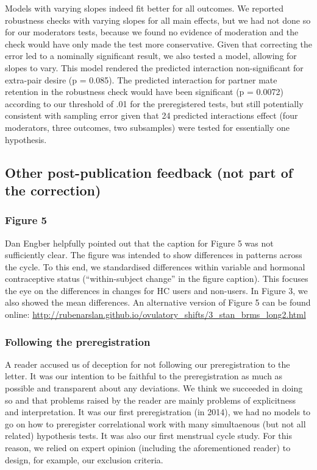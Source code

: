 \documentclass[]{article}
\begin{document}
Models with varying slopes indeed fit better for all outcomes. We
reported robustness checks with varying slopes for all main effects, but
we had not done so for our moderators tests, because we found no
evidence of moderation and the check would have only made the test more
conservative. Given that correcting the error led to a nominally
significant result, we also tested a model, allowing for slopes to vary.
This model rendered the predicted interaction non-significant for
extra-pair desire (p = 0.085). The predicted interaction for partner
mate retention in the robustness check would have been significant (p =
0.0072) according to our threshold of .01 for the preregistered tests,
but still potentially consistent with sampling error given that 24
predicted interactions effect (four moderators, three outcomes, two
subsamples) were tested for essentially one hypothesis.

\hypertarget{other-post-publication-feedback-not-part-of-the-correction}{%
\subsection{Other post-publication feedback (not part of the
correction)}\label{other-post-publication-feedback-not-part-of-the-correction}}

\hypertarget{figure-5}{%
\subsubsection{Figure 5}\label{figure-5}}

Dan Engber helpfully pointed out that the caption for Figure 5 was not
sufficiently clear. The figure was intended to show differences in
patterns across the cycle. To this end, we standardised differences
within variable and hormonal contraceptive status (``within-subject
change'' in the figure caption). This focuses the eye on the differences
in changes for HC users and non-users. In Figure 3, we also showed the
mean differences. An alternative version of Figure 5 can be found
online:
\url{http://rubenarslan.github.io/ovulatory_shifts/3_stan_brms_long2.html}

\hypertarget{following-the-preregistration}{%
\subsubsection{Following the
preregistration}\label{following-the-preregistration}}

A reader accused us of deception for not following our preregistration
to the letter. It was our intention to be faithful to the
preregistration as much as possible and transparent about any
deviations. We think we succeeded in doing so and that problems raised
by the reader are mainly problems of explicitness and interpretation. It
was our first preregistration (in 2014), we had no models to go on how
to preregister correlational work with many simultaenous (but not all
related) hypothesis tests. It was also our first menstrual cycle study.
For this reason, we relied on expert opinion (including the
aforementioned reader) to design, for example, our exclusion criteria.
\end{document}
